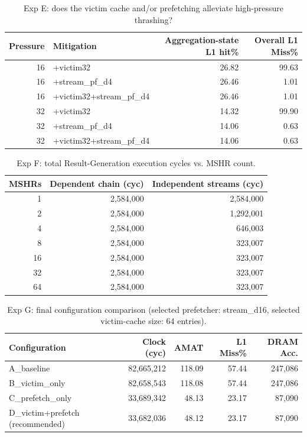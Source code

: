 \begin{table}[H]\centering\small
\begin{tabular}{rlrr}\toprule
Pressure & Mitigation & Aggregation-state L1 hit\% & Overall L1 Miss\% \\ \midrule
16 & +victim32 & 26.82 & 99.63 \\
16 & +stream\_pf\_d4 & 26.46 & 1.01 \\
16 & +victim32+stream\_pf\_d4 & 26.46 & 1.01 \\
32 & +victim32 & 14.32 & 99.90 \\
32 & +stream\_pf\_d4 & 14.06 & 0.63 \\
32 & +victim32+stream\_pf\_d4 & 14.06 & 0.63 \\
\bottomrule\end{tabular}
\caption{Exp E: does the victim cache and/or prefetching alleviate high-pressure thrashing?}
\label{tab:expE-mitigation}\end{table}

\begin{table}[H]\centering\small
\begin{tabular}{rrr}\toprule
MSHRs & Dependent chain (cyc) & Independent streams (cyc) \\ \midrule
1 & 2,584,000 & 2,584,000 \\
2 & 2,584,000 & 1,292,001 \\
4 & 2,584,000 & 646,003 \\
8 & 2,584,000 & 323,007 \\
16 & 2,584,000 & 323,007 \\
32 & 2,584,000 & 323,007 \\
64 & 2,584,000 & 323,007 \\
\bottomrule\end{tabular}
\caption{Exp F: total Result-Generation execution cycles vs. MSHR count.}
\label{tab:expF}\end{table}

\begin{table}[H]\centering\small
\begin{tabular}{lrrrr}\toprule
Configuration & Clock (cyc) & AMAT & L1 Miss\% & DRAM Acc. \\ \midrule
A\_baseline & 82,665,212 & 118.09 & 57.44 & 247,086 \\
B\_victim\_only & 82,658,543 & 118.08 & 57.44 & 247,086 \\
C\_prefetch\_only & 33,689,342 & 48.13 & 23.17 & 87,090 \\
D\_victim+prefetch (recommended) & 33,682,036 & 48.12 & 23.17 & 87,090 \\
\bottomrule\end{tabular}
\caption{Exp G: final configuration comparison (selected prefetcher: stream\_d16, selected victim-cache size: 64 entries).}
\label{tab:expG}\end{table}
